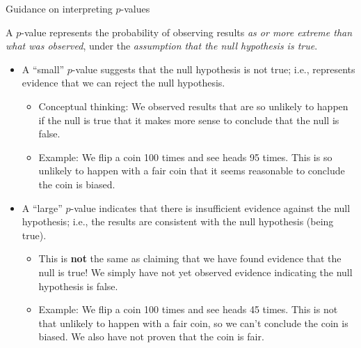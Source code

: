 \documentclass[
  ignorenonframetext,
  aspectratio=169]{beamer}
\begin{document}
\begin{frame}{Guidance on interpreting \(p\)-values}
\protect\hypertarget{guidance-on-interpreting-p-values}{}
\small

A \(p\)-value represents the probability of observing results \emph{as
or more extreme than what was observed}, under the \emph{assumption that
the null hypothesis is true}.

\begin{itemize}
\item
  A ``small'' \(p\)-value suggests that the null hypothesis is not true;
  i.e., represents evidence that we can reject the null hypothesis.

  \begin{itemize}
  \item
    Conceptual thinking: We observed results that are so unlikely to
    happen if the null is true that it makes more sense to conclude that
    the null is false.
  \item
    Example: We flip a coin 100 times and see heads 95 times. This is so
    unlikely to happen with a fair coin that it seems reasonable to
    conclude the coin is biased.
  \end{itemize}
\item
  A ``large'' \(p\)-value indicates that there is insufficient evidence
  against the null hypothesis; i.e., the results are consistent with the
  null hypothesis (being true).

  \begin{itemize}
  \item
    This is \textbf{not} the same as claiming that we have found
    evidence that the null is true! We simply have not yet observed
    evidence indicating the null hypothesis is false.
  \item
    Example: We flip a coin 100 times and see heads 45 times. This is
    not that unlikely to happen with a fair coin, so we can't conclude
    the coin is biased. We also have not proven that the coin is fair.
  \end{itemize}
\end{itemize}
\end{frame}
\end{document}
